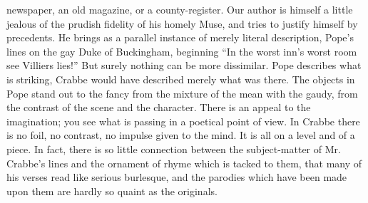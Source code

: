 newspaper, an old magazine, or a county-register. Our author is himself
a little jealous of the prudish fidelity of his homely Muse, and tries
to justify himself by precedents. He brings as a parallel instance of
merely literal description, Pope's lines on the gay Duke of Buckingham,
beginning ``In the worst inn's worst room see Villiers lies!'' But surely
nothing can be more dissimilar. Pope describes what is striking, Crabbe
would have described merely what was there. The objects in Pope stand
out to the fancy from the mixture of the mean with the gaudy, from the
contrast of the scene and the character. There is an appeal to the
imagination; you see what is passing in a poetical point of view. In
Crabbe there is no foil, no contrast, no impulse given to the mind. It
is all on a level and of a piece. In fact, there is so little connection
between the subject-matter of Mr. Crabbe's lines and the ornament of
rhyme which is tacked to them, that many of his verses read like serious
burlesque, and the parodies which have been made upon them are hardly so
quaint as the originals.

